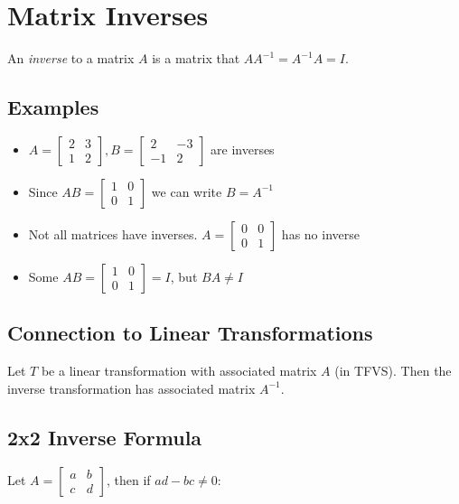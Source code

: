 \documentclass[12pt,a4paper]{article}
\begin{document}
\section{Matrix Inverses}

An \textit{inverse} to a matrix $A$ is a matrix that $AA^{-1} = A^{-1}A = I$.

\subsection{Examples}

\begin{itemize}
    \item $A = \begin{bmatrix} 2 & 3 \\ 1 & 2 \end{bmatrix}, B = \begin{bmatrix} 2 & -3 \\ -1 & 2 \end{bmatrix}$ are inverses
    \item Since $AB = \begin{bmatrix} 1 & 0 \\ 0 & 1 \end{bmatrix}$ we can write $B = A^{-1}$
    \item Not all matrices have inverses. $A = \begin{bmatrix} 0 & 0 \\ 0 & 1 \end{bmatrix}$ has no inverse
    \item Some $AB = \begin{bmatrix} 1 & 0 \\ 0 & 1 \end{bmatrix} = I$, but $BA \neq I$
\end{itemize}

\subsection{Connection to Linear Transformations}

Let $T$ be a linear transformation with associated matrix $A$ (in TFVS). Then the inverse transformation has associated matrix $A^{-1}$.

\subsection{2x2 Inverse Formula}

Let $A = \begin{bmatrix} a & b \\ c & d \end{bmatrix}$, then if $ad-bc \neq 0$:
\end{document}
